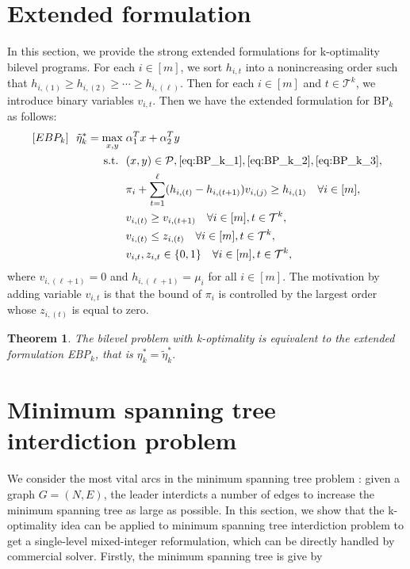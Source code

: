 \documentclass[11pt]{article}
\newtheorem{theorem}{Theorem}
\newcommand{\T}{\mathcal{T}}
\newcommand{\Pp}{\mathcal{P}}
\begin{document}
\section{Extended formulation}
In this section, we provide the strong extended formulations for k-optimality bilevel programs. For each $i\in [m]$, we sort $h_{i,t}$ into a nonincreasing order such that $h_{i,(1)} \geq h_{i,(2)} \geq \cdots \geq h_{i, (\ell)}$. Then for each $i\in [m]$ and $t\in \T^k$, we introduce binary variables $v_{i, t}$. Then we have the extended formulation for BP$_k$ as follows:
\begin{subequations}
	\begin{align}
	[EBP_k]~~\tilde{\eta}_k^* = \max_{x, y}\; & \alpha_1^Tx + \alpha_2^Ty \nonumber \\
	\text{s.t.~~} &  (x, y)\in \Pp, \eqref{eq:BP_k_1}, \eqref{eq:BP_k_2}, \eqref{eq:BP_k_3}, \nonumber \\
	& \pi_i + \sum_{t=1}^{\ell}(h_{i,(t)} - h_{i,(t+1)})v_{i,(j)} \geq h_{i, (1)} \quad \forall i \in [m], \label{eq:EBP_k_1}\\
	& v_{i,(t)} \geq v_{i,(t+1)} \quad \forall i \in [m], t\in \T^k, \label{eq:EBP_k_2}\\
	& v_{i,(t)} \leq z_{i,(t)} \quad \forall i \in [m], t\in \T^k, \label{eq:EBP_k_3}\\
	& v_{i,t}, z_{i,t} \in \{0,1\}  \quad \forall i \in [m], t\in \T^k,  \nonumber 
	\end{align}
\end{subequations}
where $v_{i,(\ell+1)} = 0$ and $h_{i,(\ell+1)} = \mu_i$ for all $i\in [m]$. The motivation by adding variable $v_{i,t}$ is that the bound of $\pi_i$ is controlled by the largest order whose $z_{i, (t)}$ is equal to zero.  


\begin{theorem}
	The bilevel problem with k-optimality is equivalent to the extended formulation EBP$_k$, that is	$\eta_k^* = \tilde{\eta}_k^*.$
\end{theorem}

\section{Minimum spanning tree interdiction problem}
We consider the most vital arcs in the minimum spanning tree problem \cite{frederickson1999increasing,zenklusen20151}: given a graph $G = (N, E)$, the leader interdicts a number of edges to increase the minimum spanning tree as large as possible.  In this section, we show that the k-optimality idea can be applied to minimum spanning tree interdiction problem to get a single-level mixed-integer reformulation, which can be directly handled by commercial solver. Firstly, the minimum spanning tree is give by
\end{document}
